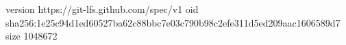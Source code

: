 version https://git-lfs.github.com/spec/v1
oid sha256:1e25c94d1ed60527ba62c88bbc7e03c790b98c2efe311d5ed209aac1606589d7
size 1048672
